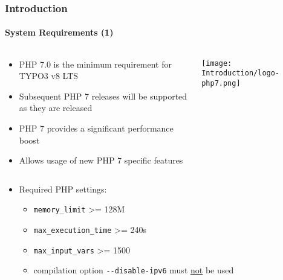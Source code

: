 \begin{frame}[fragile]
	\frametitle{Introduction}
	\framesubtitle{System Requirements (1)}


	\begin{columns}[T]

		\begin{column}{.75\textwidth}
			\tabto{0.1cm}
				\begin{itemize}
					\item PHP 7.0 is the minimum requirement\newline
						for TYPO3 v8 LTS
					\item Subsequent PHP 7 releases will be supported as they are released
					\item PHP 7 provides a significant performance boost
					\item Allows usage of new PHP 7 specific features

				\end{itemize}
		\end{column}

        \begin{column}{.25\textwidth}
			\texttt{[image: Introduction/logo-php7.png]}
        \end{column}

    \end{columns}

	\begin{itemize}
		\item Required PHP settings:

			\begin{itemize}
				\item \texttt{memory\_limit} >= 128M
				\item \texttt{max\_execution\_time} >= 240s
				\item \texttt{max\_input\_vars} >= 1500
				\item compilation option \texttt{-}\texttt{-disable-ipv6} must \underline{not} be used
			\end{itemize}
	\end{itemize}


\end{frame}

